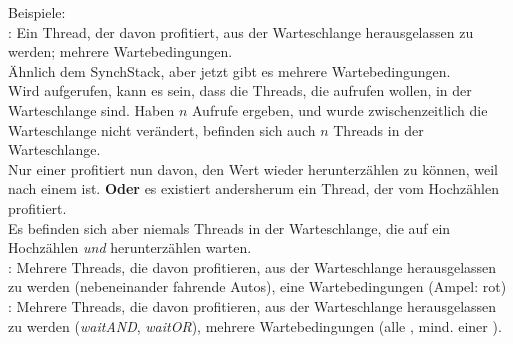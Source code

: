 \noindent
Beispiele:\\

\noindent
{}: Ein Thread, der davon profitiert, aus der Warteschlange herausgelassen zu werden; mehrere Wartebedingungen.\\
Ähnlich dem SynchStack, aber jetzt gibt es mehrere Wartebedingungen.\\
Wird  aufgerufen, kann es sein, dass die Threads, die  aufrufen wollen, in der Warteschlange sind.
Haben $n$ Aufrufe  ergeben, und wurde zwischenzeitlich die Warteschlange nicht verändert, befinden sich auch $n$ Threads in der Warteschlange.\\
Nur einer profitiert nun davon, den Wert wieder herunterzählen zu können, weil  nach einem   ist.
\textbf{Oder} es existiert andersherum ein Thread, der vom Hochzählen profitiert.\\
Es befinden sich aber niemals Threads in der Warteschlange, die auf ein Hochzählen \textit{und} herunterzählen warten.\\

\noindent
{}: Mehrere Threads, die davon profitieren, aus der Warteschlange herausgelassen zu werden (nebeneinander fahrende Autos), eine Wartebedingungen (Ampel: rot)\\

\noindent
{}: Mehrere Threads, die davon profitieren, aus der Warteschlange herausgelassen zu werden (\textit{waitAND}, \textit{waitOR}), mehrere Wartebedingungen (alle , mind. einer ).







